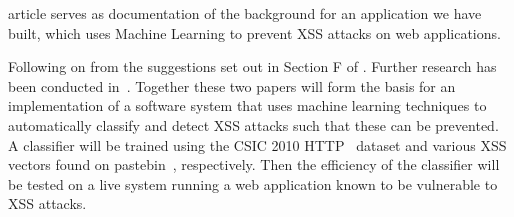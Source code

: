 \documentclass[10pt,journal,compsoc]{IEEEtran}
\begin{document}
%
\IEEEpeerreviewmaketitle







% 
% 
% 
% 
 article serves as documentation of the background for an application we have built, which uses
Machine Learning to prevent XSS attacks on web applications.

Following on from the suggestions set out in Section F of \citep*{nunan}.
Further research has been conducted in~\citep*{khan}.
Together these two papers will form the basis for an implementation of a software system that uses
machine learning techniques to automatically classify and detect XSS attacks such that these can be prevented.
A classifier will be trained using the CSIC 2010 HTTP~\citep*{csic2010} dataset and various XSS vectors
found on pastebin~\citep*{pastebin}, respectively.
Then the efficiency of the classifier will be tested on a live system running a
web application known to be vulnerable to XSS attacks.
\end{document}
